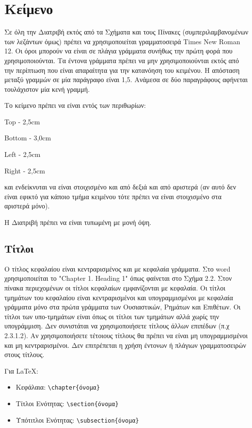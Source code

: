 \section{Κείμενο}
\label{sec:Text}

Σε όλη την Διατριβή εκτός από τα Σχήματα και τους Πίνακες
(συμπεριλαμβανομένων των λεζάντων όμως) πρέπει να χρησιμοποιείται
γραμματοσειρά Times New Roman 12. Οι όροι μπορούν να είναι σε
πλάγια γράμματα συνήθως την πρώτη φορά που χρησιμοποιούνται. Τα
έντονα γράμματα πρέπει να μην χρησιμοποιούνται εκτός από την
περίπτωση που είναι απαραίτητα για την κατανόηση του κειμένου. Η
απόσταση μεταξύ γραμμών σε μία παράγραφο είναι 1,5. Ανάμεσα σε δύο
παραγράφους αφήνεται τουλάχιστον μία κενή γραμμή.

\y Το κείμενο πρέπει να είναι εντός των περιθωρίων:

\chl Top - 2,5cm

\chl Bottom - 3,0cm

\chl Left - 2,5cm

\chl Right - 2,5cm

\chl και ενδείκνυται να είναι στοιχισμένο και από δεξιά και από
αριστερά (αν αυτό δεν είναι εφικτό για κάποιο τμήμα κειμένου τότε
πρέπει να είναι στοιχισμένο στα αριστερά μόνο).

Η Διατριβή πρέπει να είναι τυπωμένη με μονή όψη.


\subsection{Τίτλοι}
\label{subsec:Titles}

Ο τίτλος κεφαλαίου είναι κεντραρισμένος και με κεφαλαία γράμματα.
Στο word χρησιμοποιείται το "Chapter 1. Heading 1" όπως φαίνεται
στο Σχήμα 2.2.  Στον πίνακα περιεχομένων οι τίτλοι κεφαλαίων
εμφανίζονται με κεφαλαία. Οι τίτλοι τμημάτων του κεφαλαίου είναι
κεντραρισμένοι και υπογραμμισμένοι με κεφαλαία γράμματα μόνο στα
πρώτα γράμματα των Ουσιαστικών, Ρημάτων και Επιθέτων. Οι τίτλοι
των υπο-τμημάτων είναι όπως οι τίτλοι των τμημάτων αλλά χωρίς την
υπογράμμιση. Δεν συνιστάται να χρησιμοποιήσετε τίτλους άλλων
επιπέδων (π.χ 2.3.1.2). Αν χρησιμοποιήσετε τέτοιους τίτλους θα
πρέπει να είναι μη υπογραμμισμένοι και μη κεντραρισμένοι. Δεν
επιτρέπεται η χρήση έντονων ή πλάγιων γραμματοσειρών στους
τίτλους.

\y Για \LaTeX:

\begin{itemize}
\item Κεφάλαια: \verb"\chapter{όνομα}"
\item Τίτλοι Ενότητας: \verb"\section{όνομα}"
\item Υπότιτλοι Ενότητας: \verb"\subsection{όνομα}"
\end{itemize}

